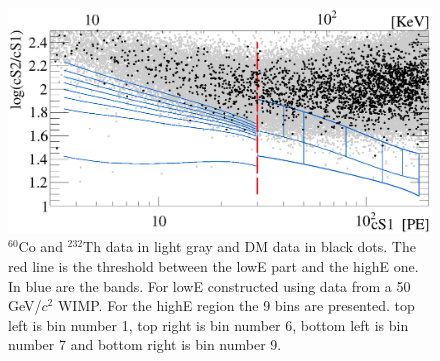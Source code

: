 \begin{table}

\caption{Bins definition. The estimated background event is calculated by taking the calibration sample and scaling it by $6.54\times10^{-3}$, which is the ratio of data and calibration in a sideband..}  \label{table:BinDef} 
\end{table}


\begin{figure}[t!]
\begin{minipage}{1\linewidth}
\centerline{\includegraphics[width=1\linewidth]{Figures/eft_sr.eps}}
\end{minipage}
\caption{$^{60}\mathrm{Co}$ and $^{232}\mathrm{Th}$ data in light gray and DM data in black dots. The red line is the threshold between the lowE part and the highE one. In blue are the bands. For lowE constructed using data from a 50 GeV/$c^2$ WIMP. For the highE region the 9 bins are presented. top left is bin number 1,  top right is bin number 6, bottom left is bin number 7 and bottom right is bin number 9.}
\label{fig:phasespace}
\end{figure}  




